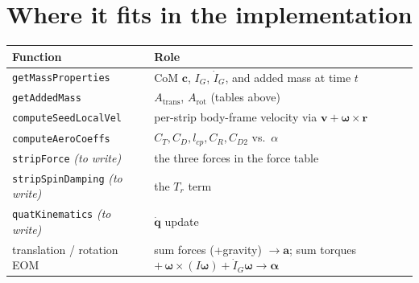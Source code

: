 \documentclass[11pt]{article}
\begin{document}
\section*{Where it fits in the implementation}
\begin{tabularx}{\textwidth}{@{} l L @{}}
\toprule
\textbf{Function} & \textbf{Role} \\
\midrule
\texttt{getMassProperties} & CoM $\mathbf c$, $I_G$, $\dot I_G$, and added mass at time $t$ \\
\texttt{getAddedMass} & $A_{\text{trans}}$, $A_{\text{rot}}$ (tables above) \\
\texttt{computeSeedLocalVel} & per-strip body-frame velocity via $\mathbf v+\boldsymbol\omega\times\mathbf r$ \\
\texttt{computeAeroCoeffs} & $C_T,C_D,l_{cp},C_R,C_{D2}$ vs.\ $\alpha$ \\
\texttt{stripForce} \emph{(to write)} & the three forces in the force table \\
\texttt{stripSpinDamping} \emph{(to write)} & the $T_r$ term \\
\texttt{quatKinematics} \emph{(to write)} & $\dot{\mathbf q}$ update \\
translation / rotation EOM & sum forces (+gravity) $\to \mathbf a$; sum torques $+\,\boldsymbol\omega\times(I\boldsymbol\omega)+\dot I_G\boldsymbol\omega \to \boldsymbol\alpha$ \\
\bottomrule
\end{tabularx}
\end{document}
